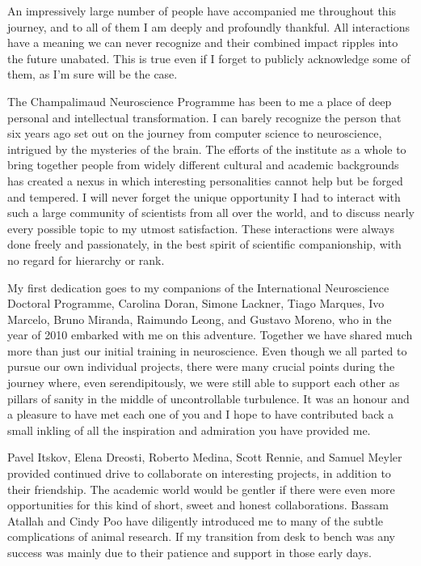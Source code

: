 

\label{acknow}

An impressively large number of people have accompanied me throughout this journey, and to all of them I am deeply and profoundly thankful. All interactions have a meaning we can never recognize and their combined impact ripples into the future unabated. This is true even if I forget to publicly acknowledge some of them, as I'm sure will be the case.

The Champalimaud Neuroscience Programme has been to me a place of deep personal and intellectual transformation. I can barely recognize the person that six years ago set out on the journey from computer science to neuroscience, intrigued by the mysteries of the brain. The efforts of the institute as a whole to bring together people from widely different cultural and academic backgrounds has created a nexus in which interesting personalities cannot help but be forged and tempered. I will never forget the unique opportunity I had to interact with such a large community of scientists from all over the world, and to discuss nearly every possible topic to my utmost satisfaction. These interactions were always done freely and passionately, in the best spirit of scientific companionship, with no regard for hierarchy or rank.

My first dedication goes to my companions of the International Neuroscience Doctoral Programme, Carolina Doran, Simone Lackner, Tiago Marques, Ivo Marcelo, Bruno Miranda, Raimundo Leong, and Gustavo Moreno, who in the year of 2010 embarked with me on this adventure. Together we have shared much more than just our initial training in neuroscience. Even though we all parted to pursue our own individual projects, there were many crucial points during the journey where, even serendipitously, we were still able to support each other as pillars of sanity in the middle of uncontrollable turbulence. It was an honour and a pleasure to have met each one of you and I hope to have contributed back a small inkling of all the inspiration and admiration you have provided me.

Pavel Itskov, Elena Dreosti, Roberto Medina, Scott Rennie, and Samuel Meyler provided continued drive to collaborate on interesting projects, in addition to their friendship. The academic world would be gentler if there were even more opportunities for this kind of short, sweet and honest collaborations. Bassam Atallah and Cindy Poo have diligently introduced me to many of the subtle complications of animal research. If my transition from desk to bench was any success was mainly due to their patience and support in those early days.

